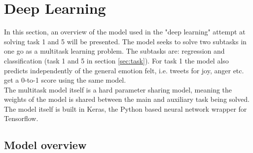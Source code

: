 
\section{Deep Learning} \label{sec:deep}
In this section, an overview of the model used in the "deep learning" attempt at solving task 1 and 5 will be presented. The model seeks to solve two subtasks in one go as a multitask learning problem. The subtasks are: regression and classification (task 1 and 5 in section \ref{sec:task}). For task 1 the model also predicts independently of the general emotion felt, i.e. tweets for joy, anger etc. get a 0-to-1 score using the same model. \\
The multitask model itself is a hard parameter sharing model, meaning the weights of the model is shared between the main and auxiliary task being solved. The model itself is built in Keras, the Python based neural network wrapper for Tensorflow. 

\subsection{Model overview}

